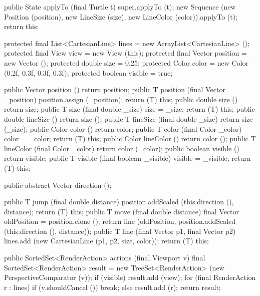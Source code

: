\documentclass{report}
\begin{document}
\begin{javacode}
{{    public State applyTo (final Turtle t) {
      super.applyTo (t);
      new Sequence (new Position  (position),
                    new LineSize  (size),
                    new LineColor (color)).applyTo (t);
      return this;
    }
  }

  protected final List<CartesianLine> lines    = new ArrayList<CartesianLine> ();
  protected final View                view     = new View (this);
  protected final Vector              position = new Vector ();
  protected       double              size     = 0.25;
  protected       Color               color    = new Color (0.2f, 0.3f, 0.3f, 0.3f);
  protected       boolean             visible  = true;

  public Vector                  position  ()                       {return position;}
  public T                       position  (final Vector _position) {position.assign (_position);
                                                                     return (T) this;}
  public double                  size      ()                       {return size;}
  public T                       size      (final double _size)     {size = _size; return (T) this;}
  public double                  lineSize  ()                       {return size ();}
  public T                       lineSize  (final double _size)     {return size (_size);}
  public Color                   color     ()                       {return color;}
  public T                       color     (final Color _color)     {color = _color; return (T) this;}
  public Color                   lineColor ()                       {return color ();}
  public T                       lineColor (final Color _color)     {return color (_color);}
  public boolean                 visible   ()                       {return visible;}
  public T                       visible   (final boolean _visible) {visible = _visible; return (T) this;}

  public abstract Vector direction ();

  public T jump (final double distance) {position.addScaled (this.direction (), distance); return (T) this;}
  public T move (final double distance) {final Vector oldPosition = position.clone ();
                                         return line (oldPosition,
                                                      position.addScaled (this.direction (), distance));}
  public T line (final Vector p1, final Vector p2)
    {lines.add (new CartesianLine (p1, p2, size, color)); return (T) this;}

  public SortedSet<RenderAction> actions (final Viewport v) {
    final SortedSet<RenderAction> result = new TreeSet<RenderAction> (new PerspectiveComparator (v));
    if (visible) result.add (view);
    for (final RenderAction r : lines) if (v.shouldCancel ()) break;
                                       else                   result.add (r);
    return result;
  }

}
\end{javacode}
\end{document}
